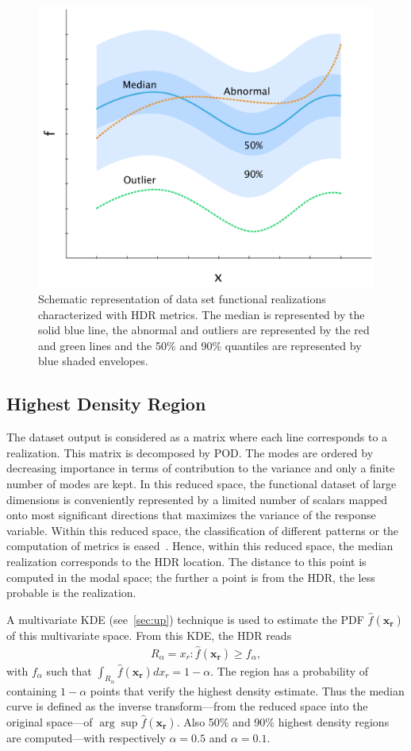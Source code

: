 \begin{figure}[!h]
\centering
\includegraphics[width=0.6\linewidth,keepaspectratio]{fig/literature/pattern_hdr.pdf}
\caption{Schematic representation of data set functional realizations characterized with HDR metrics. The median is represented by the solid blue line, the abnormal and outliers are represented by the red and green lines and the 50\% and 90\% quantiles are represented by blue shaded envelopes.}
\label{fig:pattern_hdr}
\end{figure}

\subsection{Highest Density Region}
\label{sec:HDR}

The dataset output is considered as a matrix where each line corresponds to a realization. This matrix is decomposed by POD. The modes are ordered by decreasing importance in terms of contribution to the variance and only a finite number of modes are kept. In this reduced space, the functional dataset of large dimensions is conveniently represented by a limited number of scalars mapped onto most significant directions that maximizes the variance of the response variable. Within this reduced space, the classification of different patterns or the computation of metrics is eased~\citep{Ren2017}. Hence, within this reduced space, the median realization corresponds to the HDR location. The distance to this point is computed in the modal space; the further a point is from the HDR, the less probable is the realization.

A multivariate KDE (see~\cref{sec:up}) technique is used to estimate the PDF $\hat{f}(\mathbf{x_r})$ of this multivariate space. From this KDE, the HDR reads
\begin{align}
R_\alpha = {x_r: \hat{f}(\mathbf{x_r}) \geq f_{\alpha}},
\end{align}
\noindent with $f_{\alpha}$ such that $\int_{R_\alpha} \hat{f}(\mathbf{x_r}) d x_r = 1 - \alpha$. The region has a probability of containing $1-\alpha$ points that verify the highest density estimate. Thus the median curve is defined as the inverse transform---from the reduced space into the original space---of $\arg \sup \hat{f}(\mathbf{x_r})$. Also 50\% and 90\% highest density regions are computed---with respectively $\alpha=0.5$ and $\alpha=0.1$.

